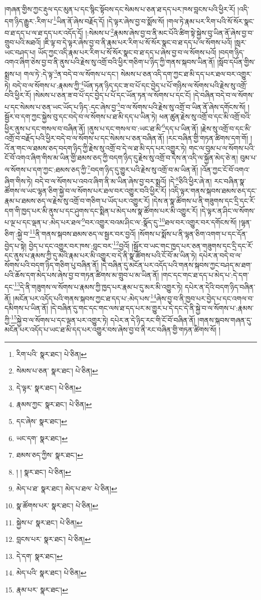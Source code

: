 །གཞན་གྱིས་ཀྱང་རྡུལ་དང་མུན་པ་དང་སྙིང་སྟོབས་དང་སེམས་པ་ཅན་ཐ་དད་པར་ཁས་བླངས་པའི་ཕྱིར་རོ། །འདི་དག་ཉིད་རྒྱུར་:རིག་པ་\footnote{རིག་པའི་  སྣར་ཐང་།  པེ་ཅིན། }ཡིན་ནོ་ཞེས་བརྗོད་དོ། །དེ་ལྟར་ཞེས་བྱ་བ་སྨོས་སོ། །གལ་ཏེ་རྣམ་པར་རིག་པའི་སོ་སོར་སྣང་བ་ཐ་དད་པ་ལ་ཐ་དད་པར་འདོད་དོ། །:སེམས་པ་\footnote{སེམས་པ་ཅན་  སྣར་ཐང་།  པེ་ཅིན། }རྣམས་ཞེས་བྱ་བ་ནི་མང་པོའི་ཚིག་སྟེ་སྐྱེས་བུ་ཡིན་ནོ་ཞེས་བྱ་བ་གྲུབ་པའི་མཐའོ། །ཇི་ལྟ་བ་དེ་ལྟར་ཞེས་བྱ་བ་ནི་རྣམ་པར་རིག་པ་སོ་སོར་སྣང་བ་ཐ་དད་པ་ལ་སོགས་པའོ། །སླར་ཡང་བཤད་པ། ཡོད་ཀྱང་འདི་རྣམ་པར་རིག་པ་སོ་སོར་སྣང་བ་ཐ་དད་པ་ཞེས་བྱ་བ་ལ་སོགས་པའོ། །བདག་ཉིད་འགའ་ཞིག་ཅེས་བྱ་བ་ནི་ནུས་པའི་རྗེས་སུ་འགྲོ་བའི་ཕྱིར་གཅིག་པ་ཉིད་ཀྱི་གནས་སྐབས་ཡིན་ནོ། །སློབ་དཔོན་གྱིས་སྨྲས་པ། གལ་ཏེ་:དེ་ལྟ་\footnote{དེ་ལྟར་  སྣར་ཐང་།  པེ་ཅིན། }ན་བདེ་བ་ལ་སོགས་པ་དང་། སེམས་པ་ཅན་འདི་དག་ཀྱང་ཐ་མི་དད་པར་ཐལ་བར་འགྱུར་ཏེ། བདེ་བ་ལ་སོགས་པ་:རྣམས་ཀྱི་\footnote{རྣམས་ཀྱང་  སྣར་ཐང་།  པེ་ཅིན། }ཡོན་ཏན་ཉིད་དང་ཟ་བ་པོ་དང་བྱེད་པ་པོ་གཉིས་ལ་སོགས་པའི་རྗེས་སུ་འགྲོ་བའི་ཕྱིར་རོ། །སེམས་པ་ཅན་ཟ་བ་པོ་དང་བྱེད་པ་པོ་དང་ཡོན་ཏན་ལ་སོགས་པ་དང་ངོ། །དེ་བཞིན་བདེ་བ་ལ་སོགས་པ་དང་སེམས་པ་ཅན་ཡང་ཡོད་པ་ཉིད་:དང་ཞེས་བྱ་\footnote{དང་ཞེས་  སྣར་ཐང་། }བ་ལ་སོགས་པའི་རྗེས་སུ་འགྲོ་བ་ཡིན་ནོ་ཞེས་དགོངས་སོ། །སྦྱོར་བ་དག་ཀྱང་སྐྱེས་བུ་དང་བདེ་བ་ལ་སོགས་པ་ཐ་མི་དད་པ་ཡིན་ཏེ། ཕན་ཚུན་རྗེས་སུ་འགྲོ་བ་དང་མི་འགྲོ་བའི་ཕྱིར་ནུས་པ་དང་གསལ་བ་བཞིན་ནོ། །ནུས་པ་དང་གསལ་བ་:ཡང་ཐ་མི་\footnote{ཡང་དག་  སྣར་ཐང་། }དད་པ་ཡིན་ནོ། །རྗེས་སུ་འགྲོ་བ་དང་མི་འགྲོ་བ་བརྗོད་པའི་ཕྱིར་བདེ་བ་ལ་སོགས་པ་དང་སེམས་པ་ཅན་བཞིན་ནོ། །རང་བཞིན་གྱི་གཏན་ཚིགས་དག་གོ། །འོ་ན་གང་ལ་ཐམས་ཅད་བདག་ཉིད་ཀྱི་རྗེས་སུ་འགྲོ་བ་དེ་ལ་ཐ་མི་དད་པར་འགྱུར་ཏེ། གང་ལ་བུམ་པ་ལ་སོགས་པའི་ངོ་བོ་འགའ་ཞིག་གིས་མ་ཡིན་གྱི་ཐམས་ཅད་ཀྱི་བདག་ཉིད་དུ་རྗེས་སུ་འགྲོ་བ་དེས་ན་འདི་ལ་སྐྱོན་མེད་ཅེ་ན། བུམ་པ་ལ་སོགས་པ་དག་ཀྱང་:ཐམས་ཅད་ཀྱི་\footnote{ཐམས་ཅད་ཀྱིས་  སྣར་ཐང་། }བདག་ཉིད་དུ་གྱུར་པའི་རྗེས་སུ་འགྲོ་བ་མ་ཡིན་ནོ། །འོན་ཀྱང་ངོ་བོ་འགའ་ཞིག་གིས་ཏེ། བདེ་བ་ལ་སོགས་པ་འབའ་ཞིག་ནི་མ་ཡིན་ཞེས་བྱ་བར་སྨྲའོ། །དེ་\footnote{། །  སྣར་ཐང་།  པེ་ཅིན། }ཅིའི་ཕྱིར་ཞེ་ན། རང་བཞིན་སྣ་ཚོགས་ལ་ཡང་ལྷན་ཅིག་སྐྱེ་བ་ལ་སོགས་པར་ཐལ་བར་འགྱུར་བའི་ཕྱིར་རོ། །འདི་ལྟར་གནས་སྐབས་ཐམས་ཅད་དང་རྣམ་པ་ཐམས་ཅད་ལ་རྗེས་སུ་འགྲོ་བ་གཅིག་པ་ཡོད་པར་འགྱུར་རོ། །དེས་ན་སྣ་ཚོགས་པ་ནི་གཟུགས་དང་དྲི་དང་རོ་དག་གི་ཁྱད་པར་མི་ནུས་པ་དང་ཤུགས་དང་སྨིན་པ་མེད་པས་སྣ་ཚོགས་པར་མི་འགྱུར་རོ། །དེ་ལྟར་ན་ཤིང་ལ་སོགས་པ་ལྔ་པ་དང་ལྡན་པ་:མེད་པར་ཐལ་\footnote{མེད་པ་ཐ་  སྣར་ཐང་། མེད་པ་ཐལ་  པེ་ཅིན། }བར་འགྱུར་བའམ་ཤིང་ལ་:སྣོད་དུ་\footnote{སྣ་ཚོགས་པར་  སྣར་ཐང་།  པེ་ཅིན། }ཐལ་བར་འགྱུར་བར་དགོངས་སོ། །ལྷན་ཅིག་:སྐྱེ་བ་\footnote{སྐྱེས་པ་  སྣར་ཐང་།  པེ་ཅིན། }ནི་གནས་སྐབས་ཐམས་ཅད་ལ་སྦྱར་བར་བྱའོ། །སོགས་པ་སྨོས་པ་ནི་ལྷན་ཅིག་འགག་པ་དང་དོན་བྱེད་པ་སྟེ། བྱེད་པ་དང་འགྱུར་བར་ཁས་:བླང་བར་\footnote{བླངས་པར་  སྣར་ཐང་།  པེ་ཅིན། }བྱའོ། །སྦྱོར་བ་ཡང་གང་ཁྱད་པར་ཅན་གཟུགས་དང་དྲི་དང་རོ་དང་ནུས་པ་རྣམས་ཀྱི་དུ་མའི་རྣམ་པར་མི་འགྱུར་བ་དེ་ནི་སྣ་ཚོགས་པའི་ངོ་བོ་མ་ཡིན་ཏེ། དཔེར་ན་བདེ་བ་ལ་སོགས་པའི་བདག་ཉིད་གཅིག་པུ་བཞིན་ནོ། །དེ་བཞིན་དུ་མངོན་པར་འདོད་པའི་གནས་སྐབས་ཀྱང་བཤད་མ་ཐག་པའི་ཆོས་དག་མེད་པས་ཞེས་བྱ་བ་གཏན་ཚིགས་མ་གྲུབ་པ་མ་ཡིན་ནོ། །གང་དང་གང་ཐ་དད་པ་མེད་པ་:དེ་དག་དང་\footnote{དེ་དག་  སྣར་ཐང་། }དེ་ནི་གཟུགས་ལ་སོགས་པ་རྣམས་ཀྱི་ཁྱད་པར་རྣམ་པ་དུ་མར་མི་འགྱུར་ཏེ། དཔེར་ན་དེའི་བདག་ཉིད་བཞིན་ནོ། །མངོན་པར་འདོད་པའི་གནས་སྐབས་ཀྱང་ཐ་དད་པ་:མེད་པས་\footnote{མེད་པའི་  སྣར་ཐང་།  པེ་ཅིན། }ཞེས་བྱ་བ་ནི་ཁྱབ་པར་བྱེད་པ་དང་འགལ་བ་དམིགས་པ་ཡིན་ནོ། །དེ་བཞིན་དུ་གང་དང་གང་ལས་ཐ་དད་པར་མ་གྱུར་པ་དེ་དང་དེ་ནི་སྐྱེ་བ་ལ་སོགས་པ་:རྣམས་ཀྱི་\footnote{རྣམ་པར་  སྣར་ཐང་། }སྐྱེ་བ་ལ་སོགས་པ་དང་ལྡན་པར་འགྱུར་ཏེ། དཔེར་ན་དེ་ཉིད་རང་གི་ངོ་བོ་བཞིན་ནོ། །གནས་སྐབས་གཞན་དུ་མངོན་པར་འདོད་པ་ཡང་ཐ་མི་དད་པར་འགྱུར་བས་ཞེས་བྱ་བ་ནི་རང་བཞིན་གྱི་གཏན་ཚིགས་སོ། །

